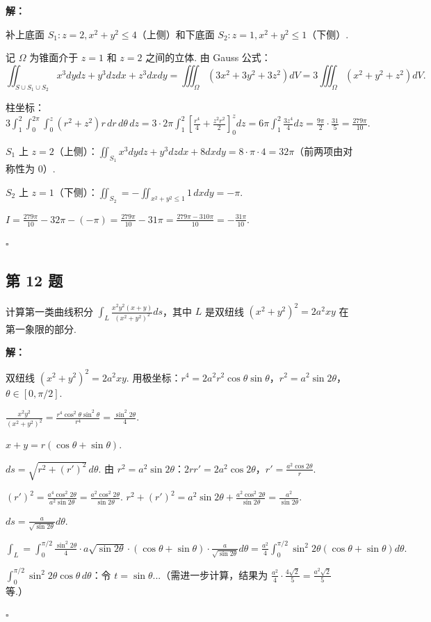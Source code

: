 \documentclass[12pt,a4paper]{article}
\newenvironment{sol}[1][解]{%
  \par\medskip\noindent\textbf{#1：}\itshape\par\noindent\ignorespaces
}{%
  \par\hfill$\square$\par\medskip
}
\begin{document}
\begin{sol}补上底面 $S_1: z=2, x^2+y^2\le 4$（上侧）和下底面 $S_2: z=1,
  x^2+y^2\le 1$（下侧）.

  记 $\Omega$ 为锥面介于 $z=1$ 和 $z=2$ 之间的立体. 由 Gauss 公式：
  $$\iint_{S\cup S_1\cup
  S_2}x^3dydz+y^3dzdx+z^3dxdy=\iiint_{\Omega}(3x^2+3y^2+3z^2)dV=3\iiint_{\Omega}(x^2+y^2+z^2)dV.$$

  柱坐标：$3\int_1^2\int_0^{2\pi}\int_0^z(r^2+z^2)r\,dr\,d\theta\,dz=3\cdot
  2\pi\int_1^2\left[\frac{r^4}{4}+\frac{z^2r^2}{2}\right]_0^zdz=6\pi\int_1^2\frac{3z^4}{4}dz=\frac{9\pi}{2}\cdot\frac{31}{5}=\frac{279\pi}{10}.$

  $S_1$ 上 $z=2$（上侧）：$\iint_{S_1}x^3dydz+y^3dzdx+8dxdy=8\cdot\pi\cdot
  4=32\pi$（前两项由对称性为 0）.

  $S_2$ 上 $z=1$（下侧）：$\iint_{S_2}=-\iint_{x^2+y^2\le 1}1\,dxdy=-\pi$.

  $I=\frac{279\pi}{10}-32\pi-(-\pi)=\frac{279\pi}{10}-31\pi=\frac{279\pi-310\pi}{10}=-\frac{31\pi}{10}.$

\end{sol}
\subsection*{第 12 题}
计算第一类曲线积分 $\int_{L}\frac{x^2y^2(x+y)}{(x^2+y^2)^2}ds$，其中 $L$ 是双纽线
$(x^2+y^2)^2=2a^2xy$ 在第一象限的部分.

\begin{sol}双纽线 $(x^2+y^2)^2=2a^2xy$.
  用极坐标：$r^4=2a^2r^2\cos\theta\sin\theta$，$r^2=a^2\sin
  2\theta$，$\theta\in[0,\pi/2]$.

  $\frac{x^2y^2}{(x^2+y^2)^2}=\frac{r^4\cos^2\theta\sin^2\theta}{r^4}=\frac{\sin^2
  2\theta}{4}$.

  $x+y=r(\cos\theta+\sin\theta)$.

  $ds=\sqrt{r^2+(r')^2}\,d\theta$. 由 $r^2=a^2\sin
  2\theta$：$2rr'=2a^2\cos 2\theta$，$r'=\frac{a^2\cos 2\theta}{r}$.

  $(r')^2=\frac{a^4\cos^2 2\theta}{a^2\sin 2\theta}=\frac{a^2\cos^2
  2\theta}{\sin 2\theta}$. $r^2+(r')^2=a^2\sin 2\theta+\frac{a^2\cos^2
  2\theta}{\sin 2\theta}=\frac{a^2}{\sin 2\theta}$.

  $ds=\frac{a}{\sqrt{\sin 2\theta}}d\theta$.

  $\int_L=\int_0^{\pi/2}\frac{\sin^2 2\theta}{4}\cdot a\sqrt{\sin
  2\theta}\cdot(\cos\theta+\sin\theta)\cdot\frac{a}{\sqrt{\sin
  2\theta}}d\theta=\frac{a^2}{4}\int_0^{\pi/2}\sin^2
  2\theta(\cos\theta+\sin\theta)d\theta.$

  $\int_0^{\pi/2}\sin^2 2\theta\cos\theta\,d\theta$：令
  $t=\sin\theta$...（需进一步计算，结果为
  $\frac{a^2}{4}\cdot\frac{4\sqrt{2}}{5}=\frac{a^2\sqrt{2}}{5}$ 等.）

\end{sol}
\end{document}
